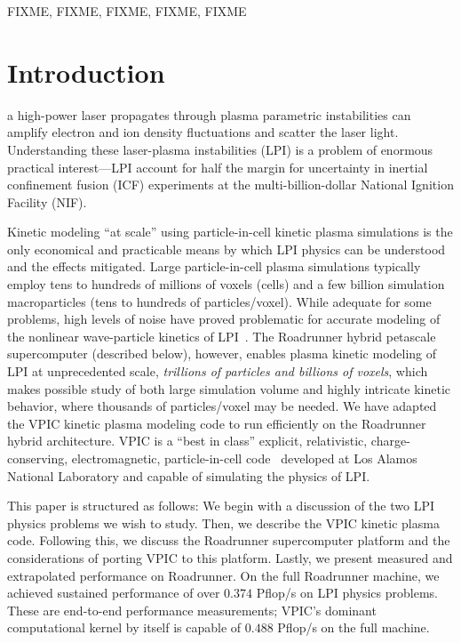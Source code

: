 \documentclass[journal,twoside]{IEEEtran}
\begin{document}
\begin{IEEEkeywords}
FIXME, FIXME, FIXME, FIXME, FIXME
\end{IEEEkeywords}

\section{Introduction}

 a high-power laser propagates through plasma
parametric instabilities can amplify electron and ion density
fluctuations and scatter the laser light.  Understanding these
laser-plasma instabilities (LPI) is a problem of enormous practical
interest---LPI account for half the margin for uncertainty in inertial
confinement fusion (ICF) experiments at the multi-billion-dollar
National Ignition Facility (NIF).

Kinetic modeling ``at scale'' using particle-in-cell kinetic plasma
simulations is the only economical and practicable means by which LPI
physics can be understood and the effects mitigated.  Large
particle-in-cell plasma simulations typically employ tens to hundreds
of millions of voxels (cells) and a few billion simulation
macroparticles (tens to hundreds of particles/voxel).  While adequate
for some problems, high levels of noise have proved problematic for
accurate modeling of the nonlinear wave-particle kinetics of
LPI~\cite{Yin_et_al_Phys_Plasmas_2006}.  The Roadrunner hybrid
petascale supercomputer (described below), however, enables plasma
kinetic modeling of LPI at unprecedented scale,
\textit{trillions of particles and billions of voxels}, which makes 
possible study of both large simulation volume and highly intricate
kinetic behavior, where thousands of particles/voxel may be needed.
We have adapted the VPIC kinetic plasma modeling code to run
efficiently on the Roadrunner hybrid architecture.  VPIC is a ``best
in class'' explicit, relativistic, charge-conserving, electromagnetic,
particle-in-cell code~\cite{Bowers_et_al_Phys_Plasmas_2007} developed
at Los Alamos National Laboratory and capable of simulating the
physics of LPI.

This paper is structured as follows: We begin with a discussion of the
two LPI physics problems we wish to study.  Then, we describe the VPIC
kinetic plasma code.  Following this, we discuss the Roadrunner
supercomputer platform and the considerations of porting VPIC to this
platform.  Lastly, we present measured and extrapolated performance on
Roadrunner.  On the full Roadrunner machine, we achieved sustained
performance of over $0.374$ Pflop/s on LPI physics problems.  These
are end-to-end performance measurements; VPIC's dominant computational
kernel by itself is capable of $0.488$ Pflop/s on the full machine.
\end{document}
